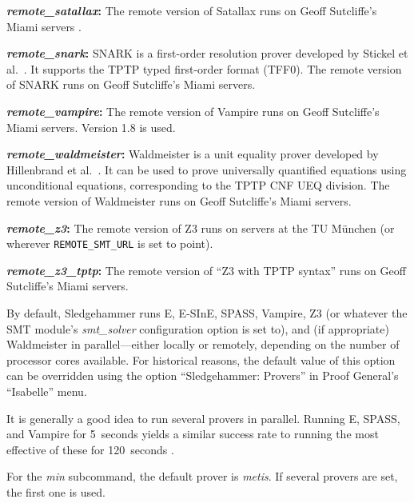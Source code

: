 \documentclass[a4paper,12pt]{article}
\begin{document}
\begin{enum}
\begin{enum}
\item[\labelitemi] \textbf{\textit{remote\_satallax}:} The remote version of
Satallax runs on Geoff Sutcliffe's Miami servers \cite{sutcliffe-2000}.

\item[\labelitemi] \textbf{\textit{remote\_snark}:} SNARK is a first-order
resolution prover developed by Stickel et al.\ \cite{snark}. It supports the
TPTP typed first-order format (TFF0). The remote version of SNARK runs on
Geoff Sutcliffe's Miami servers.

\item[\labelitemi] \textbf{\textit{remote\_vampire}:} The remote version of
Vampire runs on Geoff Sutcliffe's Miami servers. Version 1.8 is used.

\item[\labelitemi] \textbf{\textit{remote\_waldmeister}:} Waldmeister is a unit
equality prover developed by Hillenbrand et al.\ \cite{waldmeister}. It can be
used to prove universally quantified equations using unconditional equations,
corresponding to the TPTP CNF UEQ division. The remote version of Waldmeister
runs on Geoff Sutcliffe's Miami servers.

\item[\labelitemi] \textbf{\textit{remote\_z3}:} The remote version of Z3 runs on
servers at the TU M\"unchen (or wherever \texttt{REMOTE\_SMT\_URL} is set to
point).

\item[\labelitemi] \textbf{\textit{remote\_z3\_tptp}:} The remote version of ``Z3
with TPTP syntax'' runs on Geoff Sutcliffe's Miami servers.
\end{enum}

By default, Sledgehammer runs E, E-SInE, SPASS, Vampire, Z3 (or whatever
the SMT module's \textit{smt\_solver} configuration option is set to), and (if
appropriate) Waldmeister in parallel---either locally or remotely, depending on
the number of processor cores available. For historical reasons, the default
value of this option can be overridden using the option ``Sledgehammer:
Provers'' in Proof General's ``Isabelle'' menu.

It is generally a good idea to run several provers in parallel. Running E,
SPASS, and Vampire for 5~seconds yields a similar success rate to running the
most effective of these for 120~seconds \cite{boehme-nipkow-2010}.

For the \textit{min} subcommand, the default prover is \textit{metis}. If
several provers are set, the first one is used.


\end{enum}
\end{document}
